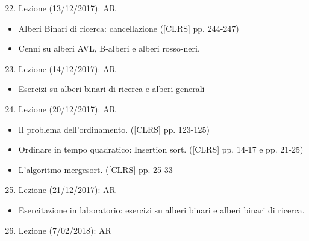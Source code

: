 \documentclass{article}
\providecommand{\tightlist}{%
  \setlength{\itemsep}{0pt}\setlength{\parskip}{0pt}}
\begin{document}
\begin{enumerate}
\setcounter{enumi}{21}
\tightlist
\item
  {Lezione (13/12/2017): AR}
\end{enumerate}

\begin{itemize}
\tightlist
\item
  {Alberi Binari di ricerca: cancellazione ({[}CLRS{]} pp. 244-247)}
\item
  {Cenni su alberi AVL, B-alberi e alberi rosso-neri.}
\end{itemize}

\begin{enumerate}
\setcounter{enumi}{22}
\tightlist
\item
  {Lezione (14/12/2017): AR}
\end{enumerate}

\begin{itemize}
\tightlist
\item
  {Esercizi su alberi binari di ricerca e alberi generali}
\end{itemize}

\begin{enumerate}
\setcounter{enumi}{23}
\tightlist
\item
  {Lezione (20/12/2017): AR}
\end{enumerate}

\begin{itemize}
\tightlist
\item
  {Il problema dell'ordinamento. ({[}CLRS{]} pp. 123-125)}
\item
  {Ordinare in tempo quadratico: Insertion sort. ({[}CLRS{]} pp. 14-17 e
  pp. 21-25)}
\item
  {L'algoritmo mergesort. ({[}CLRS{]} pp. 25-33}
\end{itemize}

\begin{enumerate}
\setcounter{enumi}{24}
\tightlist
\item
  {Lezione (21/12/2017): AR}
\end{enumerate}

\begin{itemize}
\tightlist
\item
  {Esercitazione in laboratorio: esercizi su alberi binari e alberi
  binari di ricerca.}
\end{itemize}

\begin{enumerate}
\setcounter{enumi}{25}
\tightlist
\item
  {Lezione (7/02/2018): AR}
\end{enumerate}
\end{document}
